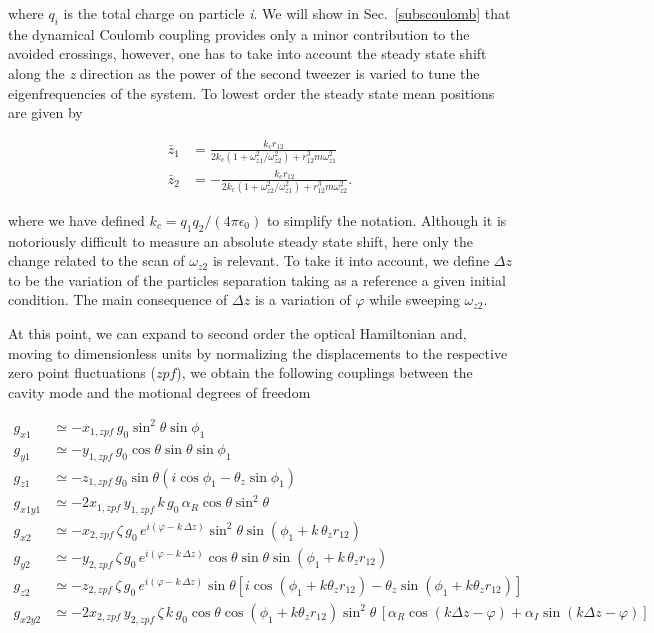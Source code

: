 \documentclass[aps,PRA,%
 amsmath,amssymb,
singlecolumn,
notitlepage,superscriptaddress,groupedaddress]{revtex4}
\newcommand{\di}{i}
\begin{document}
\noindent where $q_i$ is the total charge on particle \emph{i}. We will show in Sec.~\ref{subscoulomb} that the dynamical Coulomb coupling provides only a minor contribution to the avoided crossings, however, one has to take into account the steady state shift along the \emph{z} direction as the power of  the second tweezer is varied to tune the eigenfrequencies of the system. To lowest order the steady state mean positions are given by

\begin{align}\label{eqs_steady}
    \bar{z}_1&= \frac{k_c r_{12}}{2 k_c (1+\omega_{z1}^2/\omega_{z2}^2)+r_{12}^3 m \omega_{z1}^{2}}\\
    \label{eqs_steady1}
    \bar{z}_2&= -\frac{k_c r_{12}}{2 k_c (1+\omega_{z2}^2/\omega_{z1}^2)+r_{12}^3 m \omega_{z2}^{2}}.
\end{align}

\noindent where we have defined $k_c=q_1q_2/(4\pi\epsilon_0)$ to simplify the notation. Although it is notoriously difficult to measure an absolute steady state shift, here only the change  related to the scan of $\omega_{z2}$ is relevant. To take it into account, we define $\Delta z$ to be the variation of the particles separation taking as a reference a given initial condition. The main consequence of $\Delta z$ is a variation of $\varphi$ while sweeping $\omega_{z2}$.

At this point, we can expand to second order the optical Hamiltonian and, moving to dimensionless units by normalizing the displacements to the respective zero point fluctuations ($zpf$), we obtain the following couplings between the cavity mode and the motional degrees of freedom

\begin{align}
    g_{x1}&\simeq -x_{1,zpf}\, g_0 \sin^2{\theta} \sin{\phi_1} \\
    g_{y1}&\simeq -y_{1,zpf}\, g_0 \cos{\theta}\sin{\theta} \sin{\phi_1} \\
    g_{z1}&\simeq -z_{1,zpf}\, g_0 \sin{\theta} (\di\cos{\phi_1}-\theta_z\sin{\phi_1})\\
    g_{x1y1}&\simeq - 2x_{1,zpf}\,y_{1,zpf}\, k\, g_0 \,\alpha_R \cos{\theta}\sin^2{\theta}\\
    g_{x2}&\simeq -x_{2,zpf}\, \zeta \,g_0 \,e^{\di(\varphi-k\,\Delta z)} \sin^2{\theta} \sin(\phi_1+k\,\theta_z r_{12}) \\
    g_{y2}&\simeq -y_{2,zpf}\, \zeta \,g_0 \, e^{\di(\varphi-k\,\Delta z)} \cos{\theta} \sin{\theta}\sin(\phi_1+k\,\theta_z r_{12}) \\
    g_{z2}&\simeq -z_{2,zpf}\, \zeta \,g_0 \, e^{\di(\varphi-k\,\Delta z)} \sin{\theta}[\di\cos(\phi_1+k\theta_z r_{12})-\theta_z\sin(\phi_1+k\theta_z  r_{12})]\\
    g_{x2y2}&\simeq - 2 x_{2,zpf}\,y_{2,zpf} \,\zeta\, k\, g_0 \cos \theta \cos(\phi_1+k\theta_z r_{12})\sin^2\theta\,[\alpha_R\cos(k \Delta z-\varphi)+\alpha_I \sin(k\Delta z-\varphi)]
\end{align}
\end{document}
